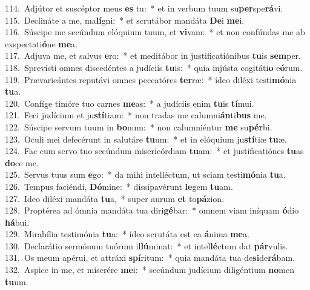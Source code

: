{114.~}Adjútor et suscéptor meus \textbf{es} tu:~* et in verbum tuum su\textbf{per}spe\textbf{rá}vi.\\
{115.~}Declináte a me, ma\textbf{lí}gni:~* et scrutábor mandáta \textbf{De}i \textbf{me}i.\\
{116.~}Súscipe me secúndum elóquium tuum, et \textbf{vi}vam:~* et non confúndas me ab exspectati\textbf{ó}ne \textbf{me}a.\\
{117.~}Adjuva me, et salvus \textbf{e}ro:~* et meditábor in justificatiónibus \textbf{tu}is \textbf{sem}per.\\
{118.~}Sprevísti omnes discedéntes a judíciis \textbf{tu}is:~* quia injústa cogitáti\textbf{o} e\textbf{ó}rum.\\
{119.~}Prævaricántes reputávi omnes peccatóres \textbf{ter}ræ:~* ídeo diléxi testi\textbf{mó}nia \textbf{tu}a.\\
{120.~}Confíge timóre tuo carnes \textbf{me}as:~* a judíciis enim \textbf{tu}is \textbf{tí}mui.\\
{121.~}Feci judícium et ju\textbf{stí}tiam:~* non tradas me calumni\textbf{án}ti\textbf{bus} me.\\
{122.~}Súscipe servum tuum in \textbf{bo}num:~* non calumniéntur \textbf{me} su\textbf{pér}bi.\\
{123.~}Oculi mei defecérunt in salutáre \textbf{tu}um:~* et in elóquium ju\textbf{stí}tiæ \textbf{tu}æ.\\
{124.~}Fac cum servo tuo secúndum misericórdiam \textbf{tu}am:~* et justificatiónes \textbf{tu}as \textbf{do}ce me.\\
{125.~}Servus tuus sum \textbf{e}go:~* da mihi intelléctum, ut sciam testi\textbf{mó}nia \textbf{tu}a.\\
{126.~}Tempus faciéndi, \textbf{Dó}mine:~* dissipavérunt \textbf{le}gem \textbf{tu}am.\\
{127.~}Ideo diléxi mandáta \textbf{tu}a,~* super aurum \textbf{et} to\textbf{pá}zion.\\
{128.~}Proptérea ad ómnia mandáta tua diri\textbf{gé}bar:~* omnem viam iníquam \textbf{ó}dio \textbf{há}bui.\\
{129.~}Mirabília testimónia \textbf{tu}a:~* ídeo scrutáta est ea \textbf{á}nima \textbf{me}a.\\
{130.~}Declarátio sermónum tuórum il\textbf{lú}minat:~* et intel\textbf{lé}ctum dat \textbf{pár}vulis.\\
{131.~}Os meum apérui, et attráxi \textbf{spí}ritum:~* quia mandáta tua de\textbf{si}de\textbf{rá}bam.\\
{132.~}Aspice in me, et miserére \textbf{me}i:~* secúndum judícium diligéntium \textbf{no}men \textbf{tu}um.\\
